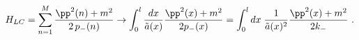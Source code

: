 \begin{equation}
\label{eq:M particle Hamiltonian 4}
    H_{LC}= \sum_{n=1}^M
    \frac{\pp^2 (n) + m^2}{2 \, p_- (n)}
    \to
    \int_0^l \frac{dx}{\tilde a(x)}
    \frac{\pp^2 (x) + m^2}{2 p_-(x)} =
    \int_0^l dx\; \frac{1}{\tilde a(x)^2}
    \frac{\pp^2 (x) + m^2}{2 k_-} \ .
\end{equation}

